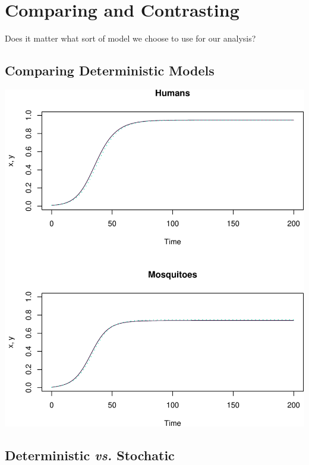 \documentclass[
]{book}
\begin{document}
\section{Comparing and Contrasting}\label{comparing-and-contrasting}

Does it matter what sort of model we choose to use for our analysis?

\subsection{Comparing Deterministic Models}\label{comparing-deterministic-models}

\includegraphics{docs/figs/unnamed-chunk-64-1.pdf}

\subsection{\texorpdfstring{Deterministic \emph{vs.} Stochatic}{Deterministic vs. Stochatic}}\label{deterministic-vs.-stochatic}
\end{document}

